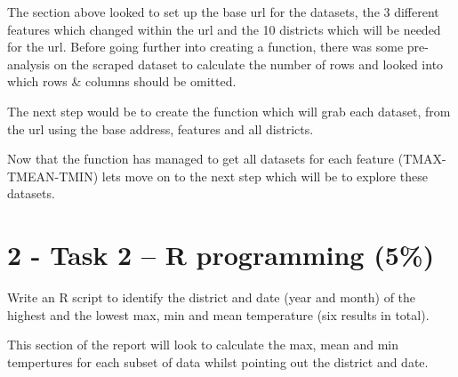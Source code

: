 \documentclass[
]{article}
\begin{document}
The section above looked to set up the base url for the datasets, the 3
different features which changed within the url and the 10 districts
which will be needed for the url. Before going further into creating a
function, there was some pre-analysis on the scraped dataset to
calculate the number of rows and looked into which rows \& columns
should be omitted.

The next step would be to create the function which will grab each
dataset, from the url using the base address, features and all
districts.

Now that the function has managed to get all datasets for each feature
(TMAX-TMEAN-TMIN) lets move on to the next step which will be to explore
these datasets.

\hypertarget{task-2-r-programming-5}{%
\section{2 - Task 2 -- R programming
(5\%)}\label{task-2-r-programming-5}}

Write an R script to identify the district and date (year and month) of
the highest and the lowest max, min and mean temperature (six results in
total).

This section of the report will look to calculate the max, mean and min
tempertures for each subset of data whilst pointing out the district and
date.
\end{document}
